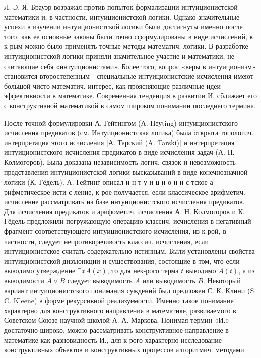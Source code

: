 \documentclass[10pt]{article}
\begin{document}
Л. Э. Я. Брауэр возражал против попыток формализации интуиционистской математики и, в частности, интуиционистской логики. Однако значительные успехи в изучении интуиционистской логики были достигнуты именно после того, как ее основные законы были точно сформулированы в виде исчислений, к к-рым можно было применять точные методы математич. логики. В разработке интуиционистской логики приняли значительное участие и математики, не считающие себя «интуиционистами». Более того, вопрос «веры в интуиционизм» становится второстепенным - специальные интуиционистские исчисления имеют большой чисто математич. интерес, как проясняющие различные идеи эффективности в математике. Современная тенденция в развитии И. сближает его с конструктивной математикой в самом широком понимании последнего термина.



После точной формулировки А. Гейтингом (А. Неуting) интуиционистского исчисления предикатов (см. Интуиционистская логика) была открыта топологич. интерпретация этого исчисления [А. Тарский (A. Tarski)] и интерпретация интуиционистского исчисления предикатов в виде исчисления задач (А. Н. Колмогоров). Была доказана независимость логич. связок и невозможность представления интуиционистской логики высказываний в виде конечнозначной логики (К. Гёдель). А. Гейтинг описал и н т у и ц и о н и с тское а рифметическое исти с ление, к-рое получается, если классическое арифметич. исчисление рассматривать на базе интуиционистского исчисления предикатов. Для исчисления предикатов и арифометич. исчисления А. Н. Колмогоров и К. Гёдель предложили погружающую операцию классич. исчисления в негативный фрагмент соответствующего интуиционистского исчисления, из к-рой, в частности, следует непротиворечивость классич. исчисления, если интуиционистское считать содержательно истинным. Были установлены свойства интуиционистской дизъюнкции и существования, состоящие в том, что если выводимо утверждение $\exists x A(x)$, то для нек-рого терма $t$ выводимо $A(t)$, а из выводимости $A \vee B$ следует выводимость $A$ или выводимость $B$. Некоторый вариант интуиционистского понимания суждений был предложен С. К. Клини (S. C. Kleene) в форме рекурсивной реализуемости. Именно такое понимание характерно для конструктивного направления в математике, развиваемого в Советском Союзе научной школой А. А. Маркова. Понимая термин «И.» достаточно широко, можно рассматривать конструктивное направление в математике как разновидность И., для к-рого характерно исследование конструктивных объектов и конструктивных процессов алгоритмич. методами.
\end{document}
